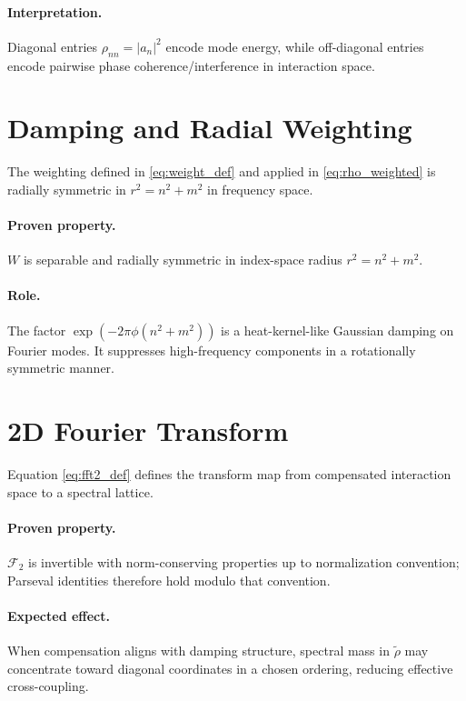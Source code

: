 \documentclass[11pt]{article}
\begin{document}
\paragraph{Interpretation.}
Diagonal entries $\rho_{nn}=|a_n|^2$ encode mode energy, while off-diagonal entries encode pairwise phase coherence/interference in interaction space.

\section{Damping and Radial Weighting}
The weighting defined in \eqref{eq:weight_def} and applied in \eqref{eq:rho_weighted} is radially symmetric in $r^2=n^2+m^2$ in frequency space.

\paragraph{Proven property.}
$W$ is separable and radially symmetric in index-space radius $r^2=n^2+m^2$.

\paragraph{Role.}
The factor $\exp\!(-2\pi\phi(n^2+m^2))$ is a heat-kernel-like Gaussian damping on Fourier modes. It suppresses high-frequency components in a rotationally symmetric manner.

\section{2D Fourier Transform}
Equation \eqref{eq:fft2_def} defines the transform map from compensated interaction space to a spectral lattice.

\paragraph{Proven property.}
$\mathcal{F}_2$ is invertible with norm-conserving properties up to normalization convention; Parseval identities therefore hold modulo that convention.

\paragraph{Expected effect.}
When compensation aligns with damping structure, spectral mass in $\widetilde{\rho}$ may concentrate toward diagonal coordinates in a chosen ordering, reducing effective cross-coupling.
\end{document}
